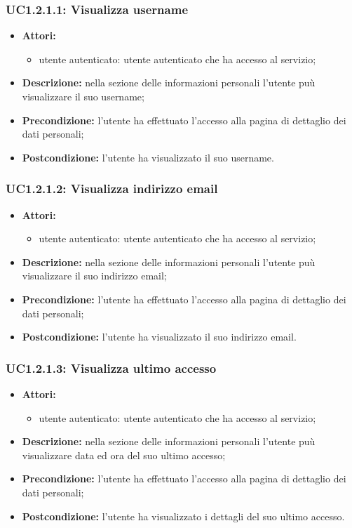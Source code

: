 \subsubsection{UC1.2.1.1: Visualizza username}

\begin{itemize}
	\item \textbf{Attori:}
	\begin{itemize}
		\item utente autenticato: utente autenticato che ha accesso al servizio;
	\end{itemize}
	\item \textbf{Descrizione:} nella sezione delle informazioni personali l'utente puù visualizzare il suo username;
	\item \textbf{Precondizione:} l'utente ha effettuato l'accesso alla pagina di dettaglio dei dati personali;
	\item \textbf{Postcondizione:} l'utente ha visualizzato il suo username.
\end{itemize}

\subsubsection{UC1.2.1.2: Visualizza indirizzo email}

\begin{itemize}
	\item \textbf{Attori:}
	\begin{itemize}
		\item utente autenticato: utente autenticato che ha accesso al servizio;
	\end{itemize}
	\item \textbf{Descrizione:} nella sezione delle informazioni personali l'utente puù visualizzare il suo indirizzo email;
	\item \textbf{Precondizione:} l'utente ha effettuato l'accesso alla pagina di dettaglio dei dati personali;
	\item \textbf{Postcondizione:} l'utente ha visualizzato il suo indirizzo email.
\end{itemize}

\subsubsection{UC1.2.1.3: Visualizza ultimo accesso}

\begin{itemize}
	\item \textbf{Attori:}
	\begin{itemize}
		\item utente autenticato: utente autenticato che ha accesso al servizio;
	\end{itemize}
	\item \textbf{Descrizione:} nella sezione delle informazioni personali l'utente puù visualizzare data ed ora del suo ultimo accesso;
	\item \textbf{Precondizione:} l'utente ha effettuato l'accesso alla pagina di dettaglio dei dati personali;
	\item \textbf{Postcondizione:} l'utente ha visualizzato i dettagli del suo ultimo accesso.
\end{itemize}

